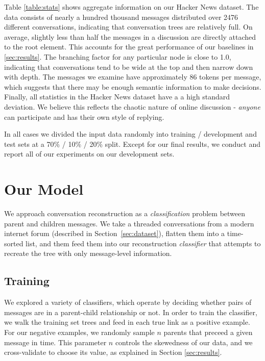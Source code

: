 \documentclass{article}
\begin{document}
Table \ref{table:stats} shows aggregate information on our Hacker News
dataset. The data consists of nearly a hundred thousand messages distributed
over 2476 different conversations, indicating that conversation trees are
relatively full. On average, slightly less than half the messages in a
discussion are directly attached to the root element. This accounts for the
great performance of our baselines in \ref{sec:results}. The branching factor
for any particular node is close to 1.0, indicating that conversations tend to
be wide at the top and then narrow down with depth. The messages we examine
have approximately 86 tokens per message, which suggests that there may be
enough semantic information to make decisions. Finally, all statistics in the
Hacker News dataset have a a high standard deviation. We believe this reflects
the chaotic nature of online discussion - \textit{anyone} can participate and
has their own style of replying.

In all cases we divided the input data randomly into training / development
and test sets at a 70\% / 10\% / 20\% split. Except for our final results, we
conduct and report all of our experiments on our development sets.

\section{Our Model}
\label{sec:approach}
We approach conversation reconstruction as a \textit{classification} problem
between parent and children messages. We take a threaded conversations from a
modern internet forum (described in Section~\ref{sec:dataset}), flatten them
into a time-sorted list, and them feed them into our reconstruction
\textit{classifier} that attempts to recreate the tree with only message-level
information.

\subsection{Training} 
We explored a variety of classifiers, which operate by deciding whether pairs
of messages are in a parent-child  relationship or not. In order to train the
classifier, we walk the training set trees  and feed in each true link as a
positive example. For our negative examples, we randomly sample $n$ parents
that preceed a given message in time. This parameter $n$ controls  the
skewedness of our data, and we cross-validate to choose its value, as
explained in Section  \ref{sec:results}.
\end{document}
